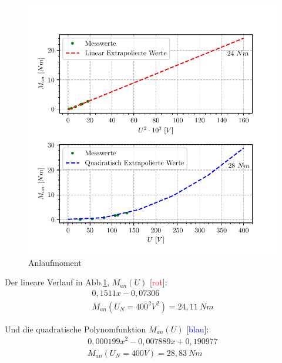 \documentclass[conference]{IEEEtran}
\begin{document}
\vspace{-7ex}
\begin{figure}[htbp]
    \centering
    \includegraphics[width=\columnwidth]{./anlaufmoment.pdf}
    \caption{Anlaufmoment}
    \label{fig:Anlaufmoment}
\end{figure}

Der lineare Verlauf in Abb.\ref{fig:Anlaufmoment}, $M_{an}(U)$ [\textcolor{red}{rot}]:
\begin{gather*}
    0,1511 x - 0,07306 \\
    M_{an}(U_N=400^2V^2)=24,11\ Nm
\end{gather*}

Und die quadratische Polynomfunktion $M_{an}(U)$ [\textcolor{blue}{blau}]:
\begin{gather*}
    0,000199 x^2 -0,007889 x + 0,190977\\
    M_{an}(U_N=400V)=28,83\ Nm
\end{gather*}
\end{document}
